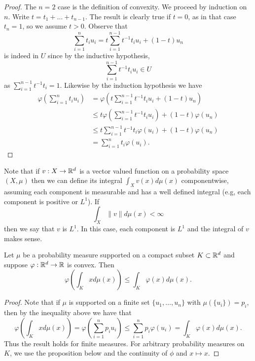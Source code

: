 \documentclass[twoside, a4paper, 10pt]{amsart}
\begin{document}
\begin{proof} The $n=2$ case is the definition of convexity. We proceed by induction on $n$. Write $t = t_1 + \ldots + t_{n-1}$. The result is clearly true if $t = 0$, as in that case $t_n = 1$, so we assume $t>0$. Observe that $$\sum_{i=1}^nt_iu_i = t\sum_{i=1}^{n-1}t^{-1}t_i u_i + (1-t)u_n$$ is indeed in $U$ since by the inductive hypothesis, $$\sum_{i=1}^{n-1}t^{-1}t_i u_i \in U$$ as $\sum_{i=1}^{n-1} t^{-1}t_i = 1$. Likewise by the induction hypothesis we have
\begin{align*} \varphi \left(\sum_{i=1}^n t_i u_i \right) &= \varphi \left( t\sum_{i=1}^{n-1}t^{-1}t_i u_i + (1-t)u_n \right) \\
&\leq t \varphi\left(\sum_{i=1}^{n-1}t^{-1}t_i u_i \right) + (1-t) \varphi(u_n) \\
&\leq t\sum_{i=1}^{n-1}t^{-1}t_i \varphi(u_i) + (1-t) \varphi(u_n) \\
&= \sum_{i=1}^n t_i \varphi(u_i).
\end{align*}

\end{proof}

Note that if $v:X \to \mathbb{R}^d$ is a vector valued function on a probability space $(X,\mu)$ then we can define its integral $\int_X v(x) d\mu(x)$ componentwise, assuming each component is measurable and has a well defined integral (e.g, each component is positive or $L^1$). If $$\int_X \|v\| d\mu(x) < \infty$$ then we say that $v$ is $L^1$. In this case, each component is $L^1$ and the integral of $v$ makes sense.

\begin{prop} Let $\mu$ be a probability measure supported on a compact subset $K \subset \mathbb{R}^d$ and suppose $\varphi:\mathbb{R}^d \to \mathbb{R}$ is convex. Then $$\varphi\left(\int_K x d\mu(x)\right) \leq \int_K \varphi(x) d\mu(x). $$

\end{prop}

\begin{proof} Note that if $\mu$ is supported on a finite set $\{u_1, \ldots, u_n\}$ with $\mu(\{u_i\}) = p_i$, then by the inequality above we have that $$ \varphi\left(\int_K x d\mu(x)\right)  = \varphi\left( \sum_{i=1}^n p_i u_i \right) \leq \sum_{i=1}^n p_i\varphi(u_i) = \int_K \varphi(x) d\mu(x) .$$ Thus the result holds for finite measures. For arbitrary probability measures on $K$, we use the proposition below and the continuity of $\phi$ and $x \mapsto x$. \end{proof}
\end{document}
